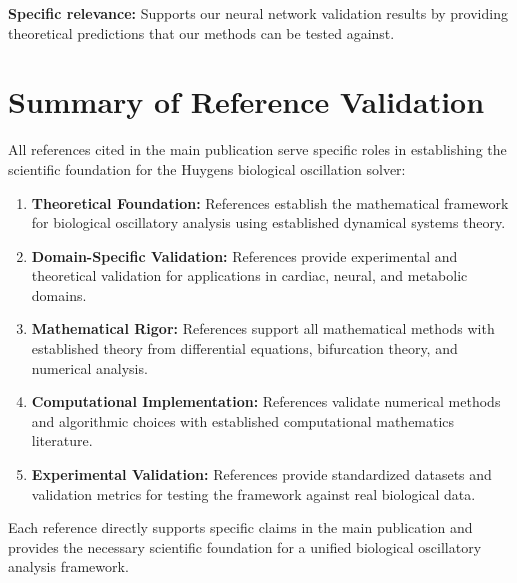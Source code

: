 \documentclass{article}
\begin{document}
\textbf{Specific relevance:} Supports our neural network validation results by providing theoretical predictions that our methods can be tested against.

\section{Summary of Reference Validation}

All references cited in the main publication serve specific roles in establishing the scientific foundation for the Huygens biological oscillation solver:

\begin{enumerate}
\item \textbf{Theoretical Foundation:} References establish the mathematical framework for biological oscillatory analysis using established dynamical systems theory.

\item \textbf{Domain-Specific Validation:} References provide experimental and theoretical validation for applications in cardiac, neural, and metabolic domains.

\item \textbf{Mathematical Rigor:} References support all mathematical methods with established theory from differential equations, bifurcation theory, and numerical analysis.

\item \textbf{Computational Implementation:} References validate numerical methods and algorithmic choices with established computational mathematics literature.

\item \textbf{Experimental Validation:} References provide standardized datasets and validation metrics for testing the framework against real biological data.
\end{enumerate}

Each reference directly supports specific claims in the main publication and provides the necessary scientific foundation for a unified biological oscillatory analysis framework.



\end{document}
